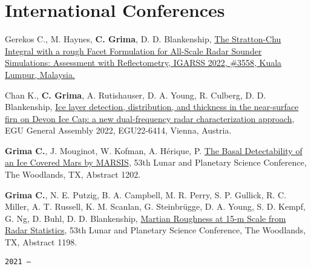 \section*{International Conferences}



\begin{etaremune}
\def\labelenumi{\arabic{enumi}.}

\item
  Gerekos C., M. Haynes, \textbf{C. Grima}, D. D. Blankenship, \href{}{The Stratton-Chu Integral with a rough Facet Formulation for All-Scale Radar Sounder Simulations: Assessment with Reflectometry, IGARSS 2022, \#3558, Kuala Lumpur, Malaysia.}
\item
  Chan K., \textbf{C. Grima}, A. Rutishauser, D. A. Young, R. Culberg, D. D. Blankenship, \href{}{Ice layer detection, distribution, and thickness in the near-surface firn on Devon Ice Cap: a new dual-frequency radar characterization approach}, EGU General Assembly 2022, EGU22-6414, Vienna, Austria.
\item
  \textbf{Grima C.}, J. Mouginot, W. Kofman, A. Hérique, P. \href{}{The Basal Detectability of an Ice Covered Mars by MARSIS}, 53th Lunar and Planetary Science Conference, The Woodlands, TX, Abstract 1202.
\item
  \textbf{Grima C.}, N. E. Putzig, B. A. Campbell, M. R. Perry, S. P. Gullick, R. C. Miller, A. T. Russell, K. M. Scanlan, G. Steinbrügge, D. A. Young, S. D. Kempf, G. Ng, D. Buhl, D. D. Blankenship, \href{}{Martian Roughness at 15-m Scale from Radar Statistics}, 53th Lunar and Planetary Science Conference, The Woodlands, TX, Abstract 1198.

\hspace{-2em}\texttt{2021 ---}


\end{etaremune}
